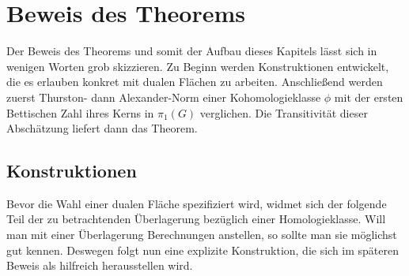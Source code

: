 \section{Beweis des Theorems}
\label{sec:proofs}
Der Beweis des Theorems und somit der Aufbau dieses Kapitels lässt sich in wenigen Worten grob skizzieren. Zu Beginn werden Konstruktionen entwickelt, die es erlauben konkret mit dualen Flächen zu arbeiten. Anschließend werden zuerst Thurston- dann Alexander-Norm einer Kohomologieklasse $\phi$ mit der ersten Bettischen Zahl ihres Kerns in $\pi_1(G)$ verglichen. Die Transitivität dieser Abschätzung liefert dann das Theorem. 

\subsection{Konstruktionen}

Bevor die Wahl einer dualen Fläche spezifiziert wird, widmet sich der folgende Teil der zu betrachtenden Überlagerung bezüglich einer Homologieklasse. Will man mit einer Überlagerung Berechnungen anstellen, so sollte man sie möglichst gut kennen. Deswegen folgt nun eine explizite Konstruktion, die sich im späteren Beweis als hilfreich herausstellen wird.

